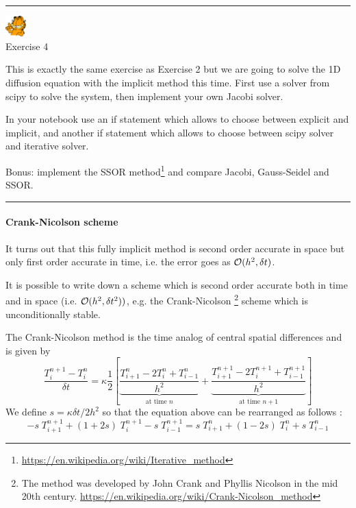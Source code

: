 \begin{center}
\begin{minipage}[t]{0.77\textwidth}
\par\noindent\rule{\textwidth}{0.4pt}

\begin{center}
\includegraphics[width=0.8cm]{images/garftr} \\
{\color{orange}Exercise 4}
\end{center}

This is exactly the same exercise as Exercise 2 but we 
are going to solve the 1D diffusion equation with the implicit method
this time. First use a solver from scipy to solve the system, then 
implement your own Jacobi solver. 

In your notebook use an if statement which allows to choose between 
explicit and implicit, and another if statement which allows to choose 
between scipy solver and iterative solver. 

Bonus: implement the SSOR method\footnote{
\url{https://en.wikipedia.org/wiki/Iterative_method}}
and compare Jacobi, Gauss-Seidel and SSOR.

\par\noindent\rule{\textwidth}{0.4pt}
\end{minipage}
\end{center}


\paragraph{Crank-Nicolson scheme} 
It turns out that this fully implicit method is second order accurate in space but 
only first order accurate in time,
i.e. the error goes as ${\cal O}(h^2,\delta t)$.   

It is possible to write down a scheme which is second order accurate both in time and in space
(i.e. ${\cal O}(h^2, \delta t^2))$, e.g. the {\color{olive}Crank-Nicolson}
\footnote{
The method was developed by John Crank and Phyllis Nicolson 
in the mid 20th century. \url{https://en.wikipedia.org/wiki/Crank-Nicolson_method}
}
scheme which is unconditionally stable. 

The Crank-Nicolson method is the time analog of central spatial differences and is given by
\begin{equation}
\frac{T_{i}^{n+1}-T_i^n}{\delta t} 
= \kappa  \frac{1}{2} \left[
\underbrace{\frac{T_{i+1}^{n} - 2T_i^{n} + T_{i-1}^{n}}{h^2}}_{\text{at time } n}
+
\underbrace{\frac{T_{i+1}^{n+1} - 2T_i^{n+1} + T_{i-1}^{n+1}}{h^2}}_{\text{at time } n+1}
\right]
\end{equation}
We define $s=\kappa \delta t/ 2h^2$ so that the equation above can be rearranged as follows :
\begin{equation}
\boxed{
-s\; T_{i+1}^{n+1} + (1+2s)\;  T_{i}^{n+1} 
-s\;  T_{i-1}^{n+1} = 
s\; T_{i+1}^{n} + (1-2s)\; T_{i}^{n} + s\; T_{i-1}^{n} 
}
\end{equation}


